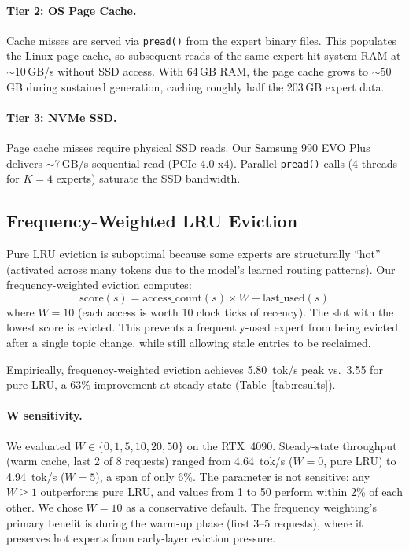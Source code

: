 \documentclass[10pt]{article}
\begin{document}
\paragraph{Tier 2: OS Page Cache.}
Cache misses are served via \texttt{pread()} from the expert binary files. This populates the Linux page cache, so subsequent reads of the same expert hit system RAM at $\sim$10\,GB/s without SSD access. With 64\,GB RAM, the page cache grows to $\sim$50\,GB during sustained generation, caching roughly half the 203\,GB expert data.

\paragraph{Tier 3: NVMe SSD.}
Page cache misses require physical SSD reads. Our Samsung 990 EVO Plus delivers $\sim$7\,GB/s sequential read (PCIe 4.0 x4). Parallel \texttt{pread()} calls (4 threads for $K=4$ experts) saturate the SSD bandwidth.

\subsection{Frequency-Weighted LRU Eviction}

Pure LRU eviction is suboptimal because some experts are structurally ``hot'' (activated across many tokens due to the model's learned routing patterns). Our frequency-weighted eviction computes:
\[
\text{score}(s) = \text{access\_count}(s) \times W + \text{last\_used}(s)
\]
where $W=10$ (each access is worth 10 clock ticks of recency). The slot with the lowest score is evicted. This prevents a frequently-used expert from being evicted after a single topic change, while still allowing stale entries to be reclaimed.

Empirically, frequency-weighted eviction achieves 5.80~tok/s peak vs.\ 3.55 for pure LRU, a 63\% improvement at steady state (Table~\ref{tab:results}).

\paragraph{W sensitivity.} We evaluated $W \in \{0, 1, 5, 10, 20, 50\}$ on the RTX~4090. Steady-state throughput (warm cache, last 2 of 8 requests) ranged from 4.64~tok/s ($W=0$, pure LRU) to 4.94~tok/s ($W=5$), a span of only 6\%. The parameter is not sensitive: any $W \geq 1$ outperforms pure LRU, and values from 1 to 50 perform within 2\% of each other. We chose $W=10$ as a conservative default. The frequency weighting's primary benefit is during the warm-up phase (first 3--5 requests), where it preserves hot experts from early-layer eviction pressure.
\end{document}
